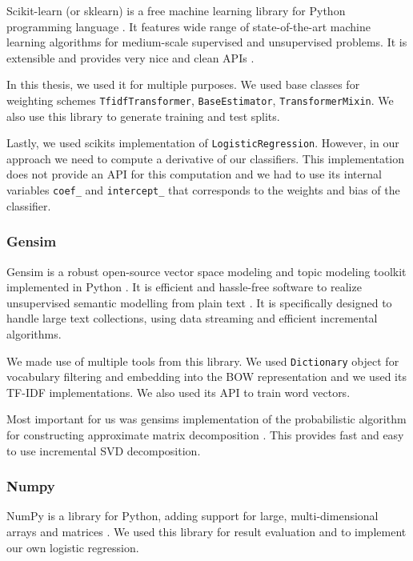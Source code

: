     Scikit-learn (or sklearn) is a free machine learning library for Python programming language \cite{scikit-learn}.
    It features wide range of state-of-the-art machine learning algorithms for medium-scale supervised and unsupervised problems.
    It is extensible and provides very nice and clean APIs \cite{sklearn_api}.
    
    In this thesis, we used it for multiple purposes.
    We used base classes for weighting schemes \texttt{TfidfTransformer}, \texttt{BaseEstimator}, \texttt{TransformerMixin}.
    We also use this library to generate training and test splits. 
    
    Lastly, we used scikits implementation of \texttt{LogisticRegression}.
    However, in our approach we need to compute a derivative of our classifiers. 
    This implementation does not provide an API for this computation and we had to use
    its internal variables \texttt{coef\_} and \texttt{intercept\_} that corresponds to the weights and bias of the classifier.
    
    \subsubsection{Gensim}
    
    Gensim is a robust open-source vector space modeling and topic modeling toolkit implemented in Python \cite{rehurek_lrec}. 
    It is efficient and hassle-free software to realize unsupervised semantic modelling from plain text \cite{bird2009natural}. %
    It is specifically designed to handle large text collections, using data streaming and efficient incremental algorithms. 
    
    We made use of multiple tools from this library. 
    We used \texttt{Dictionary} object for vocabulary filtering and embedding into the BOW representation and we used its TF-IDF implementations.
    We also used its API to train word vectors. 
    
    Most important for us was gensims implementation of the probabilistic algorithm for constructing approximate matrix decomposition \cite{halko2011finding}.
    This provides fast and easy to use incremental SVD decomposition.
    
    \subsubsection{Numpy}
    
    NumPy is a library for Python, adding support for large, multi-dimensional arrays and matrices \cite{oliphant2006guide}. %
    We used this library for result evaluation and to implement our own logistic regression.
    
